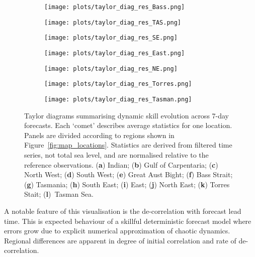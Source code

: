 \begin{figure}[H]
\begin{subfigure}{0.30\textwidth}
        \texttt{[image: plots/taylor\_diag\_res\_Bass.png]}
        \caption{}
    \end{subfigure}
    \begin{subfigure}{0.30\textwidth}
          \texttt{[image: plots/taylor\_diag\_res\_TAS.png]}
        \caption{}
    \end{subfigure}
    \begin{subfigure}{0.30\textwidth}
        \texttt{[image: plots/taylor\_diag\_res\_SE.png]}
        \caption{}
    \end{subfigure}
    \begin{subfigure}{0.30\textwidth}
        \texttt{[image: plots/taylor\_diag\_res\_East.png]}
        \caption{}
    \end{subfigure}
    \begin{subfigure}{0.30\textwidth}
        \texttt{[image: plots/taylor\_diag\_res\_NE.png]}
        \caption{}
    \end{subfigure}
    \begin{subfigure}{0.30\textwidth}
        \texttt{[image: plots/taylor\_diag\_res\_Torres.png]}
        \caption{}
    \end{subfigure}
    \begin{subfigure}{0.30\textwidth}
        \texttt{[image: plots/taylor\_diag\_res\_Tasman.png]}
        \caption{}
    \end{subfigure}
    \caption{ Taylor diagrams summarising dynamic skill evolution across 7-day forecasts.
    Each `comet' describes average statistics for one location.
    Panels are divided according to regions shown in Figure~\ref{fig:map_locations}.
    Statistics are derived from filtered time series, not total sea level, and are normalised relative to the reference observations. (\textbf{a}) Indian; (\textbf{b}) Gulf of Carpentaria; (\textbf{c}) North West; (\textbf{d}) South West; (\textbf{e}) Great Aust Bight; (\textbf{f}) Bass Strait; (\textbf{g}) Tasmania; (\textbf{h}) South East; (\textbf{i}) East; (\textbf{j}) North East; (\textbf{k}) Torres Stait; (\textbf{l})~Tasman Sea. }\vspace{-12pt}
    \label{fig:taylors}
\end{figure}   
A notable feature of this visualisation is the de-correlation with forecast lead time.   
This is expected behaviour of a skillful deterministic forecast model where errors grow due to explicit numerical approximation of chaotic dynamics. 
Regional differences are apparent in degree of initial correlation and rate of de-correlation.

